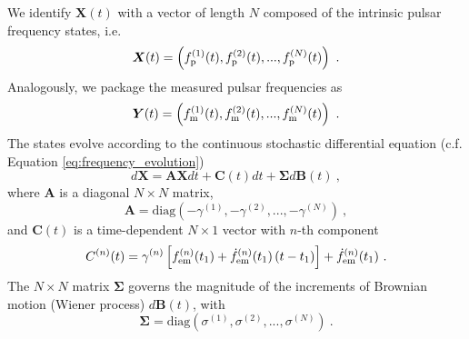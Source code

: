 \documentclass[fleqn,usenatbib,useAMS]{mnras}
\begin{document}
We identify $\boldsymbol{X}(t)$ with a vector of length $N$ composed of the intrinsic pulsar frequency states, i.e. 
\begin{equation}
	\boldsymbol{X}(t) = \left(f_{\rm p}^{(1)}(t), f_{\rm p}^{(2)}(t), ..., f_{\rm p}^{(N)}(t)\right) \ .
\end{equation}
Analogously,  we package the measured pulsar frequencies as
\begin{equation}
	\boldsymbol{Y}(t) = \left(f_{\rm m}^{(1)}(t), f_{\rm m}^{(2)}(t), ..., f_{\rm m}^{(N)}(t) \right) \ .
\end{equation}
The states evolve according to the continuous stochastic differential equation (c.f. Equation \eqref{eq:frequency_evolution})
\begin{equation}
	d \boldsymbol{X} = \boldsymbol{A} \boldsymbol{X} dt + \boldsymbol{C}(t) dt + \boldsymbol{\Sigma} d \boldsymbol{B}(t) \ , \label{eq:kalmn2}
\end{equation}
where $\boldsymbol{A}$ is a diagonal $N \times N$ matrix,
\begin{equation}
	\boldsymbol{A} = \text{diag} \left(-\gamma^{(1)}, -\gamma^{(2)}, ..., -\gamma^{(N)}\right) \ ,
\end{equation}
and $\boldsymbol{C}(t)$ is a time-dependent $N \times 1$ vector with $n$-th component
\begin{equation}
	C^{(n)}(t) =\gamma^{(n)} \left[ f^{(n)} _{\rm em} (t_1) + \dot{f}^{(n)} _{\rm em}(t_1) \, (t-t_1) \right] +  \dot{f}^{(n)} _{\rm em}(t_1)\ .
\end{equation}
The $N \times N$ matrix $\boldsymbol{\Sigma}$  governs the magnitude of the increments of Brownian motion (Wiener process) $d\boldsymbol{B}(t)$, with
\begin{equation}
	\boldsymbol{\Sigma} = \text{diag} \left(\sigma^{(1)}, \sigma^{(2)}, ..., \sigma^{(N)}\right) \ .
\end{equation}
\end{document}
